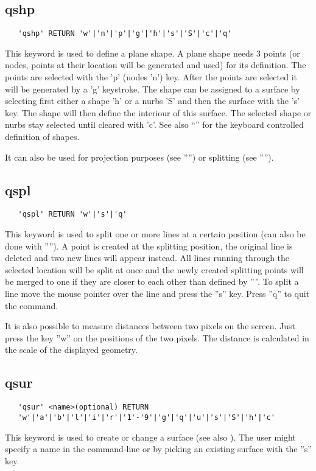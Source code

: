 \documentclass{article}
\begin{document}
\subsection{\label{qshp}qshp}
\begin{verbatim}
   'qshp' RETURN 'w'|'n'|'p'|'g'|'h'|'s'|'S'|'c'|'q'
\end{verbatim}
This keyword is used to define a plane shape. A plane shape needs 3 points (or nodes, points at their location will be generated and used) for its definition. The points are selected with the 'p' (nodes 'n') key. After the points are selected it will be generated by a 'g' keystroke. The shape can be assigned to a surface by selecting first either a shape 'h' or a nurbs 'S' and then the surface with the 's' key. The shape will then define the interiour of this surface. The selected shape or nurbs stay selected until cleared with 'c'. See also ``'' for the keyboard controlled definition of shapes.

It can also be used for projection purposes (see '''') or splitting (see '''').

\subsection{\label{qspl}qspl}
\begin{verbatim}
   'qspl' RETURN 'w'|'s'|'q' 
\end{verbatim}
This keyword is used to split one or more lines at a certain position (can also be done with ''''). A point is created at the splitting position, the original line is deleted and two new lines will appear instead. All lines running through the selected location will be split at once and the newly created splitting points will be merged to one if they are closer to each other than defined by ''''. To split a line move the mouse pointer over the line and press the ''s'' key. Press ''q'' to quit the command. 

It is also possible to measure distances between two pixels on the screen. Just press the key ''w'' on the positions of the two pixels. The distance is calculated in the scale of the displayed geometry.

\subsection{\label{qsur}qsur}
\begin{verbatim}
   'qsur' <name>(optional) RETURN
   'w'|'a'|'b'|'l'|'i'|'r'|'1'-'9'|'g'|'q'|'u'|'s'|'S'|'h'|'c'
\end{verbatim}
This keyword is used to create or change a surface (see also ). The user might specify a name in the command-line or by picking an existing surface with the ''s'' key.
\end{document}
